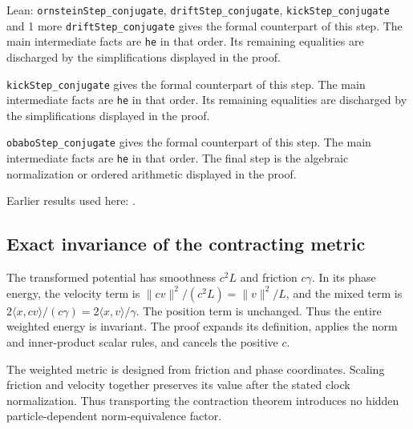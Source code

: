 \documentclass[11pt,a4paper]{report}
\begin{document}
\begin{leanbox}{Lean: \texttt{ornsteinStep\_\allowbreak{}conjugate}, \texttt{driftStep\_\allowbreak{}conjugate}, \texttt{kickStep\_\allowbreak{}conjugate} and 1 more}
\texttt{drift\allowbreak{}Step\_\allowbreak{}conjugate} gives the formal counterpart of this step. The main intermediate facts are \texttt{he} in that order. Its remaining equalities are discharged by the simplifications displayed in the proof.




\texttt{kick\allowbreak{}Step\_\allowbreak{}conjugate} gives the formal counterpart of this step. The main intermediate facts are \texttt{he} in that order. Its remaining equalities are discharged by the simplifications displayed in the proof.




\texttt{obabo\allowbreak{}Step\_\allowbreak{}conjugate} gives the formal counterpart of this step. The main intermediate facts are \texttt{he} in that order. The final step is the algebraic normalization or ordered arithmetic displayed in the proof.
\end{leanbox}


Earlier results used here: \cite[Section~3.20.1]{LangevinLean2026Kinetic}.
\subsection{\texorpdfstring{Exact invariance of the contracting metric}{Exact invariance of the contracting metric}}
\label{report-step-KIPLMC-OBABORescaling-lean-2}


The transformed potential has smoothness \(c^2L\) and friction \(c\gamma\). In its phase energy, the velocity term is \(\lVert cv\rVert^2/(c^2L)=\lVert v\rVert^2/L\), and the mixed term is \(2\langle x,cv\rangle/(c\gamma)=2\langle x,v\rangle/\gamma\). The position term is unchanged. Thus the entire weighted energy is invariant. The proof expands its definition, applies the norm and inner-product scalar rules, and cancels the positive \(c\).



The weighted metric is designed from friction and phase coordinates. Scaling friction and velocity together preserves its value after the stated clock normalization. Thus transporting the contraction theorem introduces no hidden particle-dependent norm-equivalence factor.
\end{document}
